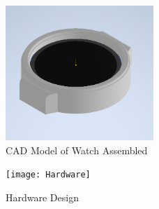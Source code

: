\documentclass[12pt, titlepage]{article}
\begin{document}
\begin{figure}[H]
	\begin{center}
		 \includegraphics[width=0.5\textwidth]{WatchCAD2}
		\caption{CAD Model of Watch Assembled}
		\label{WatchCAD2} 
	\end{center}
\end{figure}

\begin{figure}[H]
	\begin{center}
		 \texttt{[image: Hardware]}
		\caption{Hardware Design}
		\label{Hardware} 
	\end{center}
\end{figure}
\end{document}
